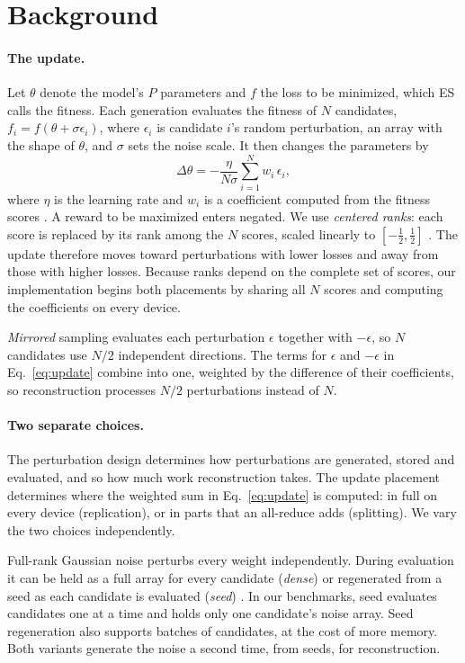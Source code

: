 \section{Background}
\label{sec:background}

\paragraph{The update.} Let $\theta$ denote the model's $P$ parameters and $f$ the loss to
be minimized, which ES calls the fitness. Each generation evaluates the fitness of $N$
candidates, $f_i=f(\theta+\sigma\epsilon_i)$, where $\epsilon_i$ is candidate $i$'s random
perturbation, an array with the shape of $\theta$, and $\sigma$ sets the noise scale. It
then changes the parameters by
\begin{equation}
  \Delta\theta = -\frac{\eta}{N\sigma}\sum_{i=1}^{N} w_i\,\epsilon_i ,
  \label{eq:update}
\end{equation}
where $\eta$ is the learning rate and $w_i$ is a coefficient computed from the fitness
scores \citep{wierstra2014,nesterov2017}. A reward to be maximized enters negated. We use
\emph{centered ranks}: each score is replaced by its rank among the $N$ scores, scaled
linearly to $[-\tfrac12,\tfrac12]$ \citep{salimans2017}. The update therefore moves toward
perturbations with lower losses and away from those with higher losses. Because ranks
depend on the complete set of scores, our implementation begins both placements by
sharing all $N$ scores and computing the coefficients on every device.

\emph{Mirrored} sampling evaluates each perturbation $\epsilon$ together with
$-\epsilon$, so $N$ candidates use $N/2$ independent directions. The terms for $\epsilon$
and $-\epsilon$ in Eq.~\ref{eq:update} combine into one, weighted by the difference of their
coefficients, so reconstruction processes $N/2$ perturbations instead of $N$.

\paragraph{Two separate choices.} The perturbation design determines how perturbations
are generated, stored and evaluated, and so how much work reconstruction takes. The
update placement determines where the weighted sum in Eq.~\ref{eq:update} is computed:
in full on every device (replication), or in parts that an all-reduce adds (splitting).
We vary the two choices independently.

Full-rank Gaussian noise perturbs every weight independently. During evaluation it can
be held as a full array for every candidate (\emph{dense}) or regenerated from a seed as
each candidate is evaluated (\emph{seed}) \citep{qiu2025}. In our benchmarks, seed
evaluates candidates one at a time and holds only one candidate's noise array. Seed
regeneration also supports batches of candidates, at the cost of more memory. Both
variants generate the noise a second time, from seeds, for reconstruction.


